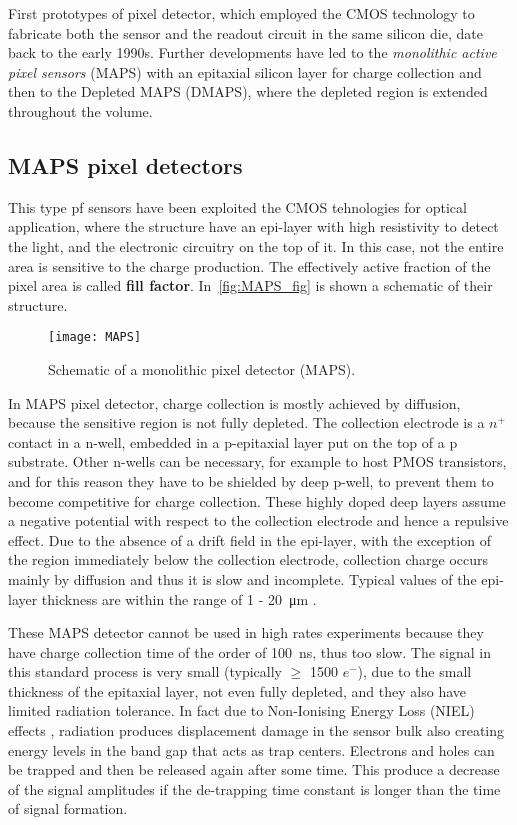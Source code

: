 First prototypes of pixel detector, which employed the CMOS technology to fabricate both the sensor and the readout circuit in the same silicon die, date back to the early 1990s. Further developments have led to the \emph{monolithic active pixel sensors} (MAPS) with an epitaxial silicon layer for charge collection and then to the Depleted MAPS (DMAPS), where the depleted region is extended throughout the volume.

\subsection{MAPS pixel detectors}

This type pf sensors have been exploited the CMOS tehnologies for optical application, where the structure have an epi-layer with high resistivity to detect the light, and the electronic circuitry on the top of it. In this case, not the entire area is sensitive to the charge production. The effectively active fraction of the pixel area is called \textbf{fill factor}. 
In~\autoref{fig:MAPS_fig} is shown a schematic of their structure. 

\begin{figure}[h!]
\centering
\texttt{[image: MAPS]}
\caption{Schematic of a monolithic pixel detector (MAPS).}
\label{fig:MAPS_fig}
\end{figure}

In MAPS pixel detector, charge collection is mostly achieved by diffusion, because the sensitive region is not fully depleted. The collection electrode is a $n^{+}$ contact in a n-well, embedded in a p-epitaxial layer put on the top of a p substrate. Other n-wells can be necessary, for example to host PMOS transistors, and for this reason they have to be shielded by deep p-well, to prevent them to become competitive for charge collection. These highly doped deep layers assume a negative potential with respect to the collection electrode and hence a repulsive effect.
Due to the absence of a drift field in the epi-layer, with the exception of the region immediately below the collection electrode, collection charge occurs mainly by diffusion and thus it is slow and incomplete. 
Typical values of the epi-layer thickness are within the range of 1 - \SI{20}{\micro m} \cite{Garcia-Sciveres:2017ymt}.

These MAPS detector cannot be used in high rates experiments because they have charge collection time of the order of \SI{100}{ns}, thus too slow. The signal in this standard process is very small (typically $\geq$ 1500 $e^{-}$), due to the small thickness of the epitaxial layer, not even fully depleted, and they also have limited radiation tolerance. 
In fact due to Non-Ionising Energy Loss (NIEL) effects \cite{wermes_book2020}, radiation produces displacement damage in the sensor bulk also creating energy levels in the band gap that acts as trap centers. 
Electrons and holes can be trapped and then be released again after some time. This produce a decrease of the signal amplitudes if the de-trapping time constant is longer than the time of signal formation. 

